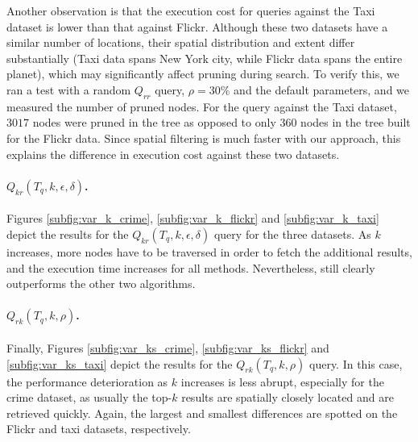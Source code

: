 Another observation is that the execution cost for queries against the Taxi dataset is lower than that against Flickr. Although these two datasets have a similar number of locations, their spatial distribution and extent differ substantially (Taxi data spans New York city, while Flickr data spans the entire planet), which may significantly affect pruning during search. To verify this, we ran a test with a random $Q_{rr}$ query, $\rho=30\%$ and the default parameters, and we measured the number of pruned nodes. For the query against the Taxi dataset, $3017$ nodes were pruned in the tree as opposed to only $360$ nodes in the tree built for the Flickr data. Since spatial filtering is much faster with our approach, this explains the difference in execution cost against these two datasets.

\paragraph{$Q_{kr}(T_q, k, \epsilon, \delta)$.} Figures \ref{subfig:var_k_crime}, \ref{subfig:var_k_flickr} and \ref{subfig:var_k_taxi} depict the results for the $Q_{kr}(T_q, k, \epsilon, \delta)$ query for the three datasets. As $k$ increases, more nodes have to be traversed in order to fetch the additional results, and the execution time increases for all methods. Nevertheless, \sbtsr still clearly outperforms the other two algorithms.

\paragraph{$Q_{rk}(T_q, k, \rho)$.} Finally, Figures \ref{subfig:var_ks_crime}, \ref{subfig:var_ks_flickr} and \ref{subfig:var_ks_taxi} depict the results for the $Q_{rk}(T_q, k, \rho)$ query. In this case, the performance deterioration as $k$ increases is less abrupt, especially for the crime dataset, as usually the top-$k$ results are spatially closely located and are retrieved quickly. Again, the largest and smallest differences are spotted on the Flickr and taxi datasets, respectively.

